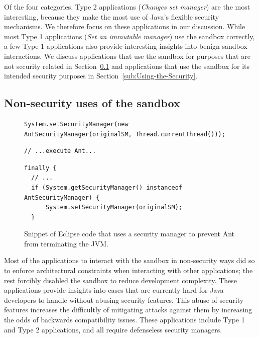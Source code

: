 \documentclass{sig-alternate}
\begin{document}
Of the four categories, Type 2 applications (\emph{Changes set manager}) are the
most interesting, because they make the most use of Java's flexible security
mechanisms.  We therefore focus   
on these applications in our discussion. While most Type 1 applications
(\emph{Set an immutable manager}) use the sandbox correctly, a few Type 1
applications also provide interesting insights into
benign sandbox interactions. We discuss applications that use the sandbox for
purposes that are not security related in Section~\ref{sub:Non-security-uses-of}
and applications that use the sandbox for its intended security purposes in
Section~\ref{sub:Using-the-Security}.

\subsection{Non-security uses of the sandbox}\label{sub:Non-security-uses-of}

\begin{figure}
\begin{lstlisting}[firstnumber=691]
System.setSecurityManager(new AntSecurityManager(originalSM, Thread.currentThread()));
\end{lstlisting}
\vspace{-0.3cm}
\begin{lstlisting}[firstnumber=703]
// ...execute Ant...
\end{lstlisting}
\vspace{-0.3cm}
\begin{lstlisting}[firstnumber=723]
finally {
  // ...
  if (System.getSecurityManager() instanceof AntSecurityManager) { 
      System.setSecurityManager(originalSM); 
  }
\end{lstlisting}\vspace{-0.3cm}
\caption{Snippet of Eclipse code that uses a security manager to prevent Ant\label{fig:Eclipse-snippet}
from terminating the JVM.}
\end{figure}

Most of the applications to interact with the sandbox in
non-security ways did so to enforce architectural constraints when interacting with
other applications; the rest forcibly disabled the sandbox to reduce development
complexity. These applications provide insights into cases that are currently
hard for Java developers to handle without abusing security features. This abuse
of security features increases the difficultly of mitigating attacks against
them by increasing the odds of backwards compatibility issues.  These applications
include Type 1 and Type 2 applications, and all require defenseless security managers.
\end{document}
